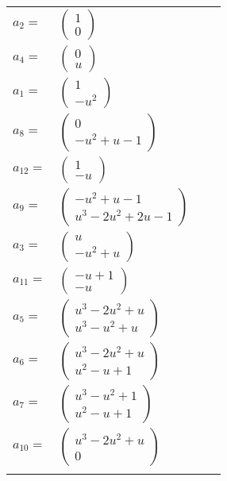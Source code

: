 \documentclass[1p]{elsarticle_modified}
\theoremstyle{definition}
\begin{document}
\begin{tabular}{m{7pt} m{180pt} m{7pt} m{180pt} }
\flushright $a_{2}=$&$\begin{pmatrix}1\\0\end{pmatrix}$ \\
\flushright $a_{4}=$&$\begin{pmatrix}0\\u\end{pmatrix}$ \\
\flushright $a_{1}=$&$\begin{pmatrix}1\\- u^2\end{pmatrix}$ \\
\flushright $a_{8}=$&$\begin{pmatrix}0\\- u^2+u-1\end{pmatrix}$ \\
\flushright $a_{12}=$&$\begin{pmatrix}1\\- u\end{pmatrix}$ \\
\flushright $a_{9}=$&$\begin{pmatrix}- u^2+u-1\\u^3-2 u^2+2 u-1\end{pmatrix}$ \\
\flushright $a_{3}=$&$\begin{pmatrix}u\\- u^2+u\end{pmatrix}$ \\
\flushright $a_{11}=$&$\begin{pmatrix}- u+1\\- u\end{pmatrix}$ \\
\flushright $a_{5}=$&$\begin{pmatrix}u^3-2 u^2+u\\u^3- u^2+u\end{pmatrix}$ \\
\flushright $a_{6}=$&$\begin{pmatrix}u^3-2 u^2+u\\u^2- u+1\end{pmatrix}$ \\
\flushright $a_{7}=$&$\begin{pmatrix}u^3- u^2+1\\u^2- u+1\end{pmatrix}$ \\
\flushright $a_{10}=$&$\begin{pmatrix}u^3-2 u^2+u\\0\end{pmatrix}$\\&\end{tabular}
\end{document}
